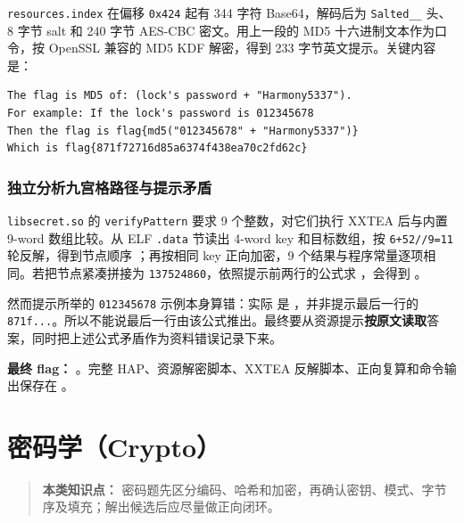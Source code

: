 \texttt{resources.index} 在偏移 \texttt{0x424} 起有 344 字符 Base64，解码后为 \texttt{Salted\_\_} 头、8 字节 salt \texttt{} 和 240 字节 AES-CBC 密文。用上一段的 MD5 十六进制文本作为口令，按 OpenSSL 兼容的 MD5 KDF 解密，得到 233 字节英文提示。关键内容是：

\begin{verbatim}
The flag is MD5 of: (lock's password + "Harmony5337").
For example: If the lock's password is 012345678
Then the flag is flag{md5("012345678" + "Harmony5337")}
Which is flag{871f72716d85a6374f438ea70c2fd62c}
\end{verbatim}

\subsection{独立分析九宫格路径与提示矛盾}\label{ux72ecux7acbux5206ux6790ux4e5dux5babux683cux8defux5f84ux4e0eux63d0ux793aux77dbux76fe}

\texttt{libsecret.so} 的 \texttt{verifyPattern} 要求 9 个整数，对它们执行 XXTEA 后与内置 9-word 数组比较。从 ELF \texttt{.data} 节读出 4-word key 和目标数组，按 \texttt{6+52//9=11} 轮反解，得到节点顺序 \texttt{\seqsplit{{[}1,3,7,5,2,4,8,6,0{]}}}；再按相同 key 正向加密，9 个结果与程序常量逐项相同。若把节点紧凑拼接为 \texttt{137524860}，依照提示前两行的公式求 \texttt{}，会得到 \texttt{}。

然而提示所举的 \texttt{012345678} 示例本身算错：实际 \texttt{} 是 \texttt{}，并非提示最后一行的 \texttt{871f...}。所以不能说最后一行由该公式推出。最终要从资源提示\textbf{按原文读取}答案，同时把上述公式矛盾作为资料错误记录下来。

\textbf{最终 flag：} \texttt{}。完整 HAP、资源解密脚本、XXTEA 反解脚本、正向复算和命令输出保存在 \texttt{}。

\chapter{密码学（Crypto）}\label{ux5bc6ux7801ux5b66crypto}

\begin{quote}
\textbf{本类知识点：} 密码题先区分编码、哈希和加密，再确认密钥、模式、字节序及填充；解出候选后应尽量做正向闭环。
\end{quote}


